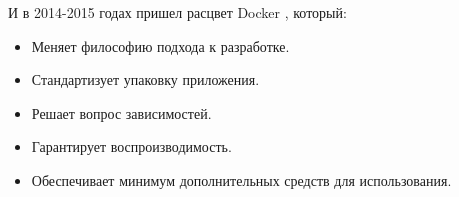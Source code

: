 \begin{enumerate}
        И в 2014-2015 годах пришел расцвет Docker \cite{демидова2019использование}, который:
        \begin{itemize}
            \item Меняет философию подхода к разработке.
            \item Стандартизует упаковку приложения.
            \item Решает вопрос зависимостей.
            \item Гарантирует воспроизводимость.
            \item Обеспечивает минимум дополнительных средств для использования.
        \end{itemize}
\end{enumerate}
